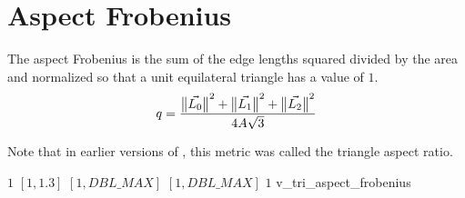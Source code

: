 \section{Aspect Frobenius\label{s:tri-aspect-Frobenius}}

The aspect Frobenius is the sum of the edge lengths squared divided by the area
and normalized so that a unit equilateral triangle has a value of $1$.
\[
  q = \frac{{\big\lVert{\vec{L_0}}\big\rVert}^{2} +
            {\big\lVert{\vec{L_1}}\big\rVert}^{2} + 
            {\big\lVert{\vec{L_2}}\big\rVert}^{2}}{4A\sqrt{3}}
\]

Note that in earlier versions of \verd{}, this metric was
called the triangle aspect ratio.

%
{$1$}%
{$[1,1.3]$}%
{$[1,DBL\_MAX]$}%
{$[1,DBL\_MAX]$}%
{$1$}%
{\cite{pebay:03}}%
{v\_tri\_aspect\_frobenius}%

